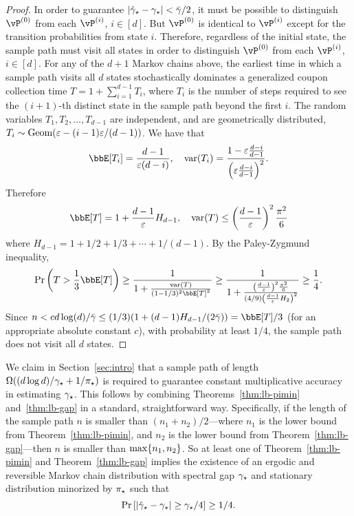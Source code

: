 \begin{proof}
  In order to guarantee $|\hat\gamma_{\star} - \gamma_{\star}| < \bar\gamma/2$, it must
  be possible to distinguish $\vP^{(0)}$ from each $\vP^{(i)}$,
  $i\in[d]$.
  But $\vP^{(0)}$ is identical to $\vP^{(i)}$ except for the transition
  probabilities from state $i$.
  Therefore, regardless of the initial state, the sample path must
  visit all states in order to distinguish $\vP^{(0)}$ from each
  $\vP^{(i)}$, $i \in [d]$.
  For any of the $d+1$ Markov chains above, the earliest time in which
  a sample path visits all $d$ states
  stochastically dominates a generalized coupon collection time $T = 1 +
  \sum_{i=1}^{d-1} T_i$, where $T_i$ is the number of steps required to
  see the $(i+1)$-th distinct state in the sample path beyond the first
  $i$.
  The random variables $T_1,T_2,\dotsc,T_{d-1}$ are independent, and are
  geometrically distributed, $T_i \sim \operatorname{Geom}(\varepsilon -
  (i-1)\varepsilon/(d-1))$.
  We have that
  \[
    \bbE[T_i] = \frac{d-1}{\veps(d-i)} , \quad
    \var(T_i) = \frac{1 - \veps \frac{d-i}{d-1}}{%
      \Parens{ \veps \frac{d-i}{d-1} }^2
    }
    .
  \]
  Therefore
  \[
    \bbE[T] = 1 + \frac{d-1}{\veps} H_{d-1} , \quad
    \var(T) \leq \Parens{ \frac{d-1}{\veps} }^2 \frac{\pi^2}{6} 
  \]
  where $H_{d-1} = 1 + 1/2 + 1/3 + \dotsb + 1/(d-1)$.
  By the Paley-Zygmund inequality,
  \[
    \Pr\Parens{ T > \frac13\bbE[T] }
    \geq \frac{1}{1 + \frac{\var(T)}{(1-1/3)^2\bbE[T]^2}}
    \geq \frac{1}{1 + \frac{\Parens{ \frac{d-1}{\veps} }^2
    \frac{\pi^2}{6}}{(4/9)\Parens{ \frac{d-1}{\veps} H_2}^2}}
    \geq \frac14
    .
  \]
  Since $n < c d\log(d) / \bar\gamma \leq (1/3) (1 + (d-1) H_{d-1} /
  (2\bar\gamma)) = \bbE[T]/3$ (for an appropriate absolute constant
  $c$), with probability at least $1/4$, the sample path does not
  visit all $d$ states.
\end{proof}

We claim in Section~\ref{sec:intro} that a sample path of length
$\Omega( (d \log d)/\gamma_{\star} + 1/\pi_{\star})$ is required to guarantee
constant multiplicative accuracy in estimating $\gamma_{\star}$.
This follows by combining Theorems~\ref{thm:lb-pimin}
and~\ref{thm:lb-gap} in a standard, straightforward way.
Specifically, if the length of the sample path $n$ is smaller than
$(n_1 + n_2) / 2$---where $n_1$ is the lower bound from
Theorem~\ref{thm:lb-pimin}, and $n_2$ is the lower bound from
Theorem~\ref{thm:lb-gap}---then $n$ is smaller than
$\max\{n_1,n_2\}$.
So at least one of Theorem~\ref{thm:lb-pimin} and
Theorem~\ref{thm:lb-gap} implies the existence of an ergodic and
reversible Markov chain distribution with spectral gap $\gamma_{\star}$ and
stationary distribution minorized by $\pi_{\star}$ such that
\[
  \Pr\left[ |\hat\gamma_{\star} - \gamma_{\star}| \geq \gamma_{\star}/4 \right] \geq 1/4
  .
\]

